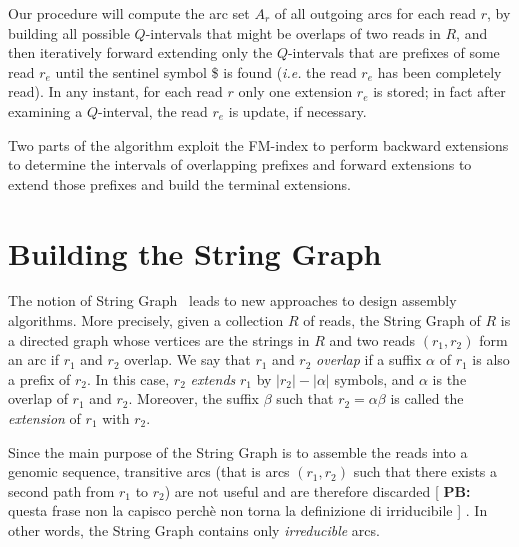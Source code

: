 \documentclass[runningheads,envcountsame,a4paper]{llncs}
\newcommand{\notaestesa}[2]{%
 \marginpar{\color{red!75!black}\textbf{\texttimes}}%
 {\color{red!75!black}%
 [\,\textbullet\,\textsf{\textbf{#1:}} %
 \textsf{\footnotesize#2}\,\textbullet\,]}%
}
\newcommand{\ie}{\textit{i.e.}\xspace}
\begin{document}


Our procedure will compute the arc set $A_r$ of all outgoing arcs for each read $r$,
by building all possible $Q$-intervals that might be overlaps of two
reads in $R$, and then iteratively forward extending only the $Q$-intervals that
are prefixes of some read $r_{e}$ until the sentinel symbol \$ is
found (\ie the read $r_{e}$ has been completely read).
In any instant, for each read $r$ only one extension $r_{e}$ is stored; in fact after examining a $Q$-interval, the read $r_{e}$ is update, if necessary.



Two parts of the algorithm exploit the FM-index to perform
backward extensions to determine the intervals of overlapping
prefixes and forward extensions to extend those prefixes and build the
terminal extensions.


\section{Building the String Graph}

The notion of String Graph~\cite{Simpson2010} leads to new approaches to design assembly algorithms.
More precisely, given a collection $R$ of reads, the String Graph of $R$ is a directed graph whose vertices are the strings in $R$ and two reads $(r_{1}, r_{2})$ form an arc if $r_{1}$ and $r_{2}$ overlap.
We say that $r_1$ and $r_2$
\emph{overlap} if a suffix $\alpha$ of $r_1$ is also a prefix of $r_2$.
In this case,
$r_2$ \emph{extends} $r_1$ by $|r_2|- |\alpha|$ symbols, and $\alpha$ is the overlap of $r_{1}$ and $r_{2}$.
Moreover,
the suffix $\beta$ such that $r_2 = \alpha \beta$ is called the
\emph{extension} of $r_1$ with $r_{2}$.

Since the main purpose of the String Graph is to assemble the reads into a genomic sequence, transitive arcs (that is arcs $(r_{1}, r_{2})$ such that there exists a second path from $r_{1}$ to $r_{2}$) are not useful and are therefore discarded \notaestesa{PB}{questa frase non la capisco perchè non torna la definizione di irriducibile}.
In other words, the String Graph contains only \emph{irreducible} arcs.
\end{document}
